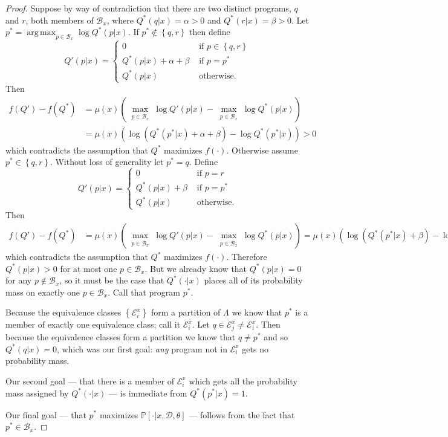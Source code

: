 \documentclass{article}
\DeclareMathOperator*{\argmax}{arg\,max} %
\newcommand{\probability}{\mathds{P}} %
\begin{document}
\begin{proof}
Suppose by way of contradiction that there are two distinct programs, $q$ and $r$,
both members of $\mathcal{B}_x$,
where $Q^*(q|x) = \alpha > 0$
and $Q^*(r|x) = \beta > 0$.
Let $p^*= \argmax_{p\in \mathcal{B}_x}\log Q^*(p|x)$.
If $p^*\not\in \left\{q,r \right\}$ then define
$$
Q'(p|x) = \begin{cases}
  0&\text{ if }p\in \left\{q,r \right\}\\
  Q^*(p|x) + \alpha + \beta&\text{ if }p = p^*\\
  Q^*(p|x)&\text{ otherwise.}
\end{cases}
$$
Then
\begin{align*}
  f(Q') - f(Q^*) &= \mu(x) \left(\max_{\substack{p\in \mathcal{B}_x}}\log  Q'(p|x) - \max_{\substack{p\in \mathcal{B}_x}}\log  Q^*(p|x) \right)\\ &= \mu(x)\left(\log \left(Q^*(p^*|x) + \alpha + \beta \right) - \log Q^*(p^*|x) \right) > 0  \end{align*}
which contradicts the assumption that $Q^*$ maximizes $f(\cdot )$.
Otherwise assume $p^*\in \left\{q,r \right\}$.
Without loss of generality let $p^* = q$.
Define
$$
Q'(p|x) = \begin{cases}
  0&\text{ if }p = r\\
  Q^*(p|x) + \beta&\text{ if }p = p^*\\
  Q^*(p|x)&\text{ otherwise.}
\end{cases}
$$
Then
\begin{align*}
  f(Q') - f(Q^*) &= \mu(x) \left(\max_{\substack{p\in \mathcal{B}_x}}\log  Q'(p|x) - \max_{\substack{p\in \mathcal{B}_x}}\log  Q^*(p|x) \right) = \mu(x)\left(\log \left(Q^*(p^*|x) + \beta \right) - \log Q^*(p^*|x) \right) > 0  \end{align*}
 which contradicts the assumption that $Q^*$ maximizes $f(\cdot )$.
 Therefore $Q^*(p|x) > 0$ for at most one $p\in \mathcal{B}_x$.
 But we already know that $Q^*(p|x) = 0$ for any $p\not\in \mathcal{B}_x$,
 so it must be the case that $Q^*(\cdot |x)$
 places all of its probability mass on exactly one $p\in \mathcal{B}_x$.
 Call that program $p^*$.

 Because the equivalence classes $\left\{\mathcal{E}_i^x \right\}$
 form a partition of $\Lambda$
 we know that $p^*$ is a member of exactly one equivalence class; call it $\mathcal{E}_i^x$.
 Let $q\in \mathcal{E}_j^x\not=\mathcal{E}_i^x$.
 Then because the equivalence classes form a partition we know that
 $q\not= p^*$
 and so $Q^*(q|x) = 0$,
 which was our first goal:
 \emph{any}
 program not in $\mathcal{E}_i^x$
 gets no probability mass.

 Our second goal --- that there is a member of $\mathcal{E}_i^x$ which gets all the probability mass assigned by $Q^*(\cdot |x)$ --- is immediate from $Q^*(p^*|x) = 1$.

 Our final goal --- that $p^*$ maximizes $\probability[\cdot |x,\mathcal{D},\theta]$
 --- follows from the fact that $p^*\in \mathcal{B}_x$.
 \end{proof}
\end{document}
